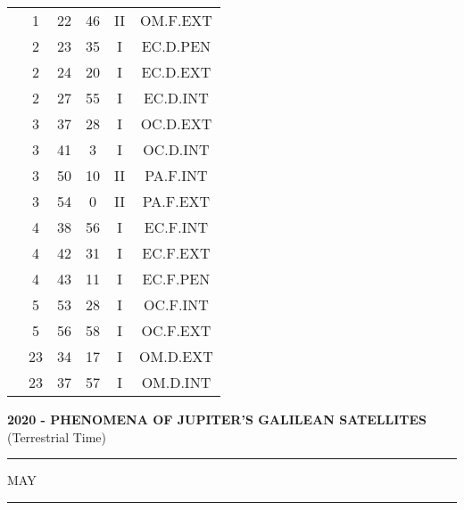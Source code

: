 \documentclass[12pt, a4paper]{article}
\begin{document}
\begin{multicols}{3}
{\begin{tabular}{c c c c c c}
	 	 	 	 & 1 & 22 & 46 & II & OM.F.EXT\\%
	 	 	 	 & 2 & 23 & 35 & I & EC.D.PEN\\%
	 	 	 	 & 2 & 24 & 20 & I & EC.D.EXT\\%
	 	 	 	 & 2 & 27 & 55 & I & EC.D.INT\\%
	 	 	 	 & 3 & 37 & 28 & I & OC.D.EXT\\%
	 	 	 	 & 3 & 41 & 3 & I & OC.D.INT\\%
	 	 	 	 & 3 & 50 & 10 & II & PA.F.INT\\%
	 	 	 	 & 3 & 54 & 0 & II & PA.F.EXT\\%
	 	 	 	 & 4 & 38 & 56 & I & EC.F.INT\\%
	 	 	 	 & 4 & 42 & 31 & I & EC.F.EXT\\%
	 	 	 	 & 4 & 43 & 11 & I & EC.F.PEN\\%
	 	 	 	 & 5 & 53 & 28 & I & OC.F.INT\\%
	 	 	 	 & 5 & 56 & 58 & I & OC.F.EXT\\%
	 	 	 	 & 23 & 34 & 17 & I & OM.D.EXT\\%
	 	 	 	 & 23 & 37 & 57 & I & OM.D.INT\\%
	 	 \end{tabular}
 	}
\end{multicols}
\textbf{2020 - PHENOMENA OF JUPITER'S GALILEAN SATELLITES}\\(Terrestrial Time) 
\vspace{0.1cm} \hrule \vspace{0.1cm}
MAY\vspace{0.1cm}
\hrule
\vspace{-0.2cm}
\end{document}

